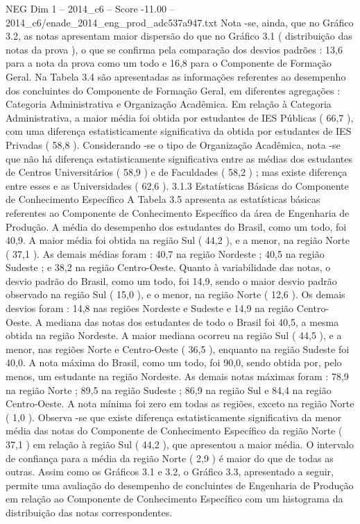 \begin{textsample}{NEG Dim 1 – 2014\_c6 – Score -11.00 – 2014\_c6/enade\_2014\_eng\_prod\_adc537a947.txt}
Nota -se, ainda, que no Gráfico 3.2, as notas apresentam maior dispersão do que no Gráfico 3.1 ( distribuição das notas da prova ), o que se confirma pela comparação dos desvios padrões : 13,6 para a nota da prova como um todo e 16,8 para o Componente de Formação Geral.
Na Tabela 3.4 são apresentadas as informações referentes ao desempenho dos concluintes do Componente de Formação Geral, em diferentes agregações : Categoria Administrativa e Organização Acadêmica.
Em relação à Categoria Administrativa, a maior média foi obtida por estudantes de IES Públicas ( 66,7 ), com uma diferença estatisticamente significativa da obtida por estudantes de IES Privadas ( 58,8 ).
Considerando -se o tipo de Organização Acadêmica, nota -se que não há diferença estatisticamente significativa entre as médias dos estudantes de Centros Universitários ( 58,9 ) e de Faculdades ( 58,2 ) ; mas existe diferença entre esses e as Universidades ( 62,6 ). 3.1.3 Estatísticas Básicas do Componente de Conhecimento Específico A Tabela 3.5 apresenta as estatísticas básicas referentes ao Componente de Conhecimento Específico da área de Engenharia de Produção.
A média do desempenho dos estudantes do Brasil, como um todo, foi 40,9.
A maior média foi obtida na região Sul ( 44,2 ), e a menor, na região Norte ( 37,1 ).
As demais médias foram : 40,7 na região Nordeste ; 40,5 na região Sudeste ; e 38,2 na região Centro-Oeste.
Quanto à variabilidade das notas, o desvio padrão do Brasil, como um todo, foi 14,9, sendo o maior desvio padrão observado na região Sul ( 15,0 ), e o menor, na região Norte ( 12,6 ).
Os demais desvios foram : 14,8 nas regiões Nordeste e Sudeste e 14,9 na região Centro-Oeste.
A mediana das notas dos estudantes de todo o Brasil foi 40,5, a mesma obtida na região Nordeste.
A maior mediana ocorreu na região Sul ( 44,5 ), e a menor, nas regiões Norte e Centro-Oeste ( 36,5 ), enquanto na região Sudeste foi 40,0.
A nota máxima do Brasil, como um todo, foi 90,0, sendo obtida por, pelo menos, um estudante na região Nordeste.
As demais notas máximas foram : 78,9 na região Norte ; 89,5 na região Sudeste ; 86,9 na região Sul e 84,4 na região Centro-Oeste.
A nota mínima foi zero em todas as regiões, exceto na região Norte ( 1,0 ).
Observa -se que existe diferença estatisticamente significativa da menor média das notas do Componente de Conhecimento Específico da região Norte ( 37,1 ) em relação à região Sul ( 44,2 ), que apresentou a maior média.
O intervalo de confiança para a média da região Norte ( 2,9 ) é maior do que de todas as outras.
Assim como os Gráficos 3.1 e 3.2, o Gráfico 3.3, apresentado a seguir, permite uma avaliação do desempenho de concluintes de Engenharia de Produção em relação ao Componente de Conhecimento Específico com um histograma da distribuição das notas correspondentes.

\end{textsample}
